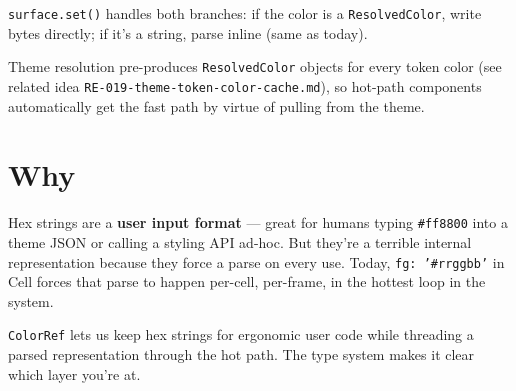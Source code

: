 \texttt{s\allowbreak{}u\allowbreak{}r\allowbreak{}f\allowbreak{}a\allowbreak{}c\allowbreak{}e\allowbreak{}.\allowbreak{}s\allowbreak{}e\allowbreak{}t\allowbreak{}(\allowbreak{})} handles both branches: if the color is a \texttt{R\allowbreak{}e\allowbreak{}s\allowbreak{}o\allowbreak{}l\allowbreak{}v\allowbreak{}e\allowbreak{}d\allowbreak{}C\allowbreak{}o\allowbreak{}l\allowbreak{}o\allowbreak{}r}, write bytes directly; if it's a string, parse inline (same as today).

Theme resolution pre-produces \texttt{R\allowbreak{}e\allowbreak{}s\allowbreak{}o\allowbreak{}l\allowbreak{}v\allowbreak{}e\allowbreak{}d\allowbreak{}C\allowbreak{}o\allowbreak{}l\allowbreak{}o\allowbreak{}r} objects for every token color (see related idea \texttt{R\allowbreak{}E\allowbreak{}-\allowbreak{}0\allowbreak{}1\allowbreak{}9\allowbreak{}-\allowbreak{}t\allowbreak{}h\allowbreak{}e\allowbreak{}m\allowbreak{}e\allowbreak{}-\allowbreak{}t\allowbreak{}o\allowbreak{}k\allowbreak{}e\allowbreak{}n\allowbreak{}-\allowbreak{}c\allowbreak{}o\allowbreak{}l\allowbreak{}o\allowbreak{}r\allowbreak{}-\allowbreak{}c\allowbreak{}a\allowbreak{}c\allowbreak{}h\allowbreak{}e\allowbreak{}.\allowbreak{}m\allowbreak{}d}), so hot-path components automatically get the fast path by virtue of pulling from the theme.

\section{Why}\label{record-371-why}

Hex strings are a \textbf{user input format} --- great for humans typing \texttt{\#\allowbreak{}f\allowbreak{}f\allowbreak{}8\allowbreak{}8\allowbreak{}0\allowbreak{}0} into a theme JSON or calling a styling API ad-hoc. But they're a terrible internal representation because they force a parse on every use. Today, \texttt{f\allowbreak{}g\allowbreak{}:\allowbreak{} \allowbreak{}'\allowbreak{}\#\allowbreak{}r\allowbreak{}r\allowbreak{}g\allowbreak{}g\allowbreak{}b\allowbreak{}b\allowbreak{}'} in Cell forces that parse to happen per-cell, per-frame, in the hottest loop in the system.

\texttt{C\allowbreak{}o\allowbreak{}l\allowbreak{}o\allowbreak{}r\allowbreak{}R\allowbreak{}e\allowbreak{}f} lets us keep hex strings for ergonomic user code while threading a parsed representation through the hot path. The type system makes it clear which layer you're at.

